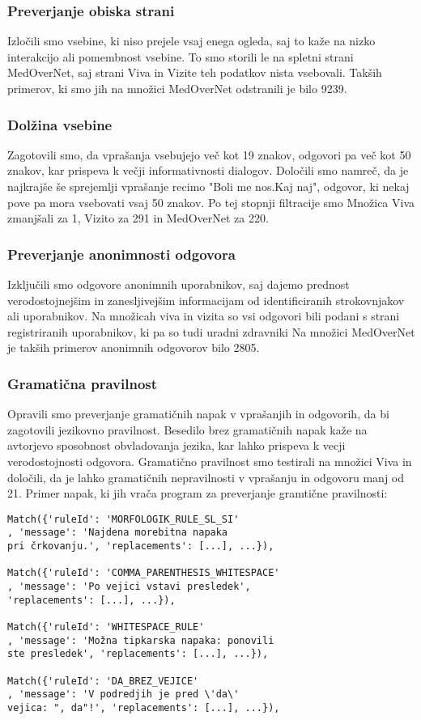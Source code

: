 \documentclass[fleqn,moreauthors,10pt]{ds_report}
\begin{document}
\subsubsection*{Preverjanje obiska strani}
Izločili smo vsebine, ki niso prejele vsaj enega ogleda, saj to kaže na nizko interakcijo ali pomembnost vsebine. To smo storili le na spletni strani MedOverNet, saj strani Viva in Vizite teh podatkov nista vsebovali. Takših primerov, ki smo jih na množici MedOverNet odstranili je bilo 9239.
 
\subsubsection*{Dolžina vsebine}
Zagotovili smo, da vprašanja vsebujejo več kot 19 znakov, odgovori pa več kot 50 znakov, kar prispeva k večji informativnosti dialogov. Določili smo namreč, da je najkrajše še sprejemlji vprašanje recimo "Boli me nos.Kaj naj", odgovor, ki nekaj pove pa mora vsebovati vsaj 50 znakov. 
Po tej stopnji filtracije smo Množica Viva zmanjšali za 1, Vizito za 291 in MedOverNet za 220.

\subsubsection*{Preverjanje anonimnosti odgovora}
Izključili smo odgovore anonimnih uporabnikov, saj dajemo prednost verodostojnejšim in zanesljivejšim informacijam od identificiranih strokovnjakov ali uporabnikov. Na množicah viva in vizita so vsi odgovori bili podani s strani registriranih uporabnikov, ki pa so tudi uradni zdravniki Na množici MedOverNet je takših primerov anonimnih odgovorov bilo 2805.

\subsubsection*{Gramatična pravilnost}
Opravili smo preverjanje gramatičnih napak v vprašanjih in odgovorih, da bi zagotovili jezikovno pravilnost. Besedilo brez gra\-ma\-ti\-čnih napak kaže na avtorjevo sposobnost obvladovanja je\-zi\-ka, kar lahko prispeva k vecji verodostojnosti odgovora. Gramatično pravilnost smo testirali na množici Viva in določili, da je lahko gramatičnih nepravilnosti v v\-pra\-šan\-ju in odgovoru manj od 21. Primer napak, ki jih vrača program za preverjanje gramtične pravilnosti:

\begin{small}
\begin{verbatim}
Match({'ruleId': 'MORFOLOGIK_RULE_SL_SI'
, 'message': 'Najdena morebitna napaka
pri črkovanju.', 'replacements': [...], ...}),

Match({'ruleId': 'COMMA_PARENTHESIS_WHITESPACE'
, 'message': 'Po vejici vstavi presledek',
'replacements': [...], ...}),

Match({'ruleId': 'WHITESPACE_RULE'
, 'message': 'Možna tipkarska napaka: ponovili
ste presledek', 'replacements': [...], ...}),

Match({'ruleId': 'DA_BREZ_VEJICE'
, 'message': 'V podredjih je pred \'da\'
vejica: ", da"!', 'replacements': [...], ...}),
\end{verbatim}
\end{small}
\end{document}
